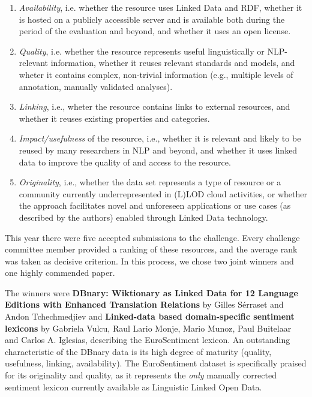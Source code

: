 \begin{enumerate}[1.]
\item \emph{Availability}, i.e. whether the resource uses Linked Data and RDF, whether it is hosted on a publicly accessible server and is available both during the period of the evaluation and beyond, and whether it uses an open license.
\item \emph{Quality}, i.e. whether the resource represents useful linguistically or NLP-relevant information, whether it reuses relevant standards and models, and wheter it contains complex, non-trivial information (e.g., multiple levels of annotation, manually validated analyses).
\item \emph{Linking}, i.e., wheter the resource contains links to external resources, and whether it reuses existing properties and categories.
\item \emph{Impact/usefulness} of the resource, i.e., whether it is relevant and likely to be reused by many researchers in NLP and beyond, and whether it uses linked data to improve the quality of and access to the resource.
\item \emph{Originality}, i.e., whether the data set represents a type of resource or a community currently underrepresented in (L)LOD cloud activities, or whether the approach facilitates novel and unforeseen applications or use cases (as described by the authors) enabled through Linked Data technology.
\end{enumerate}

\noindent	
This year there were five accepted submissions to the challenge. 
Every challenge committee member provided a ranking of these resources, and the average rank was taken as decisive criterion.
In this process, we chose two joint winners and one highly commended paper. 

The winners 
were \textbf{DBnary: Wiktionary as Linked Data for 12 Language Editions with Enhanced 
Translation Relations} by Gilles Sérraset and Andon Tchechmedjiev and \textbf{Linked-data 
based domain-specific sentiment lexicons} by Gabriela Vulcu, Raul Lario Monje, 
Mario Munoz, Paul Buitelaar and Carlos A. Iglesias, describing the EuroSentiment 
lexicon. 
An outstanding characteristic of the DBnary data is its high degree of maturity (quality, usefulness, linking, availability). 
The EuroSentiment dataset is specifically praised for its originality and quality, as it represents the \emph{only} manually corrected sentiment lexicon currently available as Linguistic Linked Open Data.

